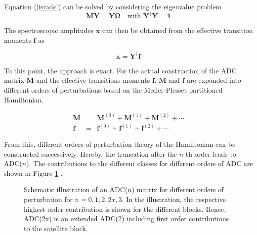 Equation (\ref{isradc}) can be solved by
considering the eigenvalue problem
\begin{equation}\label{adcewp}
\mathbf{M} \mathbf{Y} = \mathbf{Y}\mathbf{\Omega} \quad\text{with } \mathbf{Y}^\dagger\mathbf{Y}=\mathbf{1}
\end{equation}

The spectroscopic amplitudes $\mathbf{x}$ can then be obtained from the
effective transition moments $\mathbf{f}$ as

\begin{equation}
 \mathbf{x} = \mathbf{Y}^\dagger \mathbf{f}
\end{equation}

To this point, the approach is exact.
For the actual construction of the \ac{ADC} matrix $\mathbf{M}$ and the
effective transitions moments $\mathbf{f}$, $\mathbf{M}$ and $\mathbf{f}$
are expanded into different orders of perturbations based on the
M{\o}ller-Plesset partitioned Hamiltonian.

\begin{eqnarray}
\mathbf{M} &=& \mathbf{M}^{(0)} + \mathbf{M}^{(1)} + \mathbf{M}^{(2)} + \cdots\label{stf}\\
\mathbf{f} &=& \mathbf{f}^{(0)} + \mathbf{f}^{(1)} + \mathbf{f}^{(2)} + \cdots\label{stf}
\end{eqnarray}

From this, different orders of perturbation theory of the Hamiltonian can be
constructed successively. Hereby, the truncation after the $n$-th order leads
to ADC($n$). The contributions to the different classes for different
orders of \ac{ADC} are shown
in Figure \ref{figure:adcmat_pgf} \cite{Trofimov05}.

\begin{figure}[h]
  \centering
  
  \caption{Schematic illustration of an \ac{ADC}($n$) matrix for different orders
           of perturbation for $n=0,1,2,2x,3$. In the illustration, the respective
           highest order contribution is shown for the different blocks.
           Hence, ADC(2x) is an extended ADC(2) including first
           order contributions to the satellite block.}
  \label{figure:adcmat_pgf}
\end{figure}

